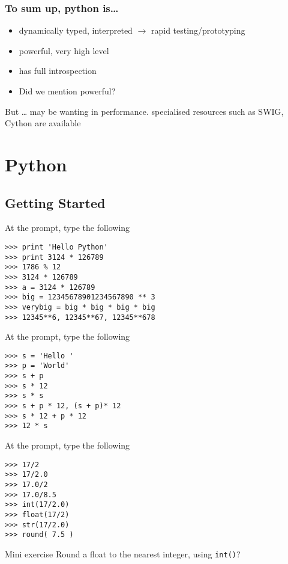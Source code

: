 \documentclass[14pt,compress]{beamer}
\newcounter{time}
\newcommand{\inctime}[1]{\addtocounter{time}{#1}{\tiny \thetime\ m}}
\begin{document}
\begin{frame}
  \frametitle{To sum up, python is\ldots}
  \begin{itemize}
  \item dynamically typed, interpreted $\rightarrow$ rapid testing/prototyping
  \item powerful, very high level
  \item has full introspection 
  \item Did we mention powerful?
  \end{itemize}
  \begin{block}{But \ldots}
    may be wanting in performance. specialised resources such as SWIG, \alert{Cython} are available 
  \end{block}
  \inctime{15}
\end{frame}


\section{Python}

\subsection{Getting Started}

\begin{frame}[fragile]{At the prompt, type the following}
   \begin{lstlisting}
>>> print 'Hello Python' 
>>> print 3124 * 126789
>>> 1786 % 12
>>> 3124 * 126789
>>> a = 3124 * 126789
>>> big = 12345678901234567890 ** 3
>>> verybig = big * big * big * big 
>>> 12345**6, 12345**67, 12345**678
  \end{lstlisting}
\end{frame}

\begin{frame}[fragile]{At the prompt, type the following}
   \begin{lstlisting}
>>> s = 'Hello '
>>> p = 'World'
>>> s + p 
>>> s * 12 
>>> s * s
>>> s + p * 12, (s + p)* 12
>>> s * 12 + p * 12
>>> 12 * s 
    \end{lstlisting}
\end{frame}

\begin{frame}[fragile]{At the prompt, type the following}
  \begin{lstlisting}
>>> 17/2
>>> 17/2.0
>>> 17.0/2
>>> 17.0/8.5
>>> int(17/2.0)
>>> float(17/2)
>>> str(17/2.0)
>>> round( 7.5 )
  \end{lstlisting}
  \begin{block}{Mini exercise}
	Round a float to the nearest integer, using \texttt{int()}?
  \end{block}
\end{frame}
\end{document}
